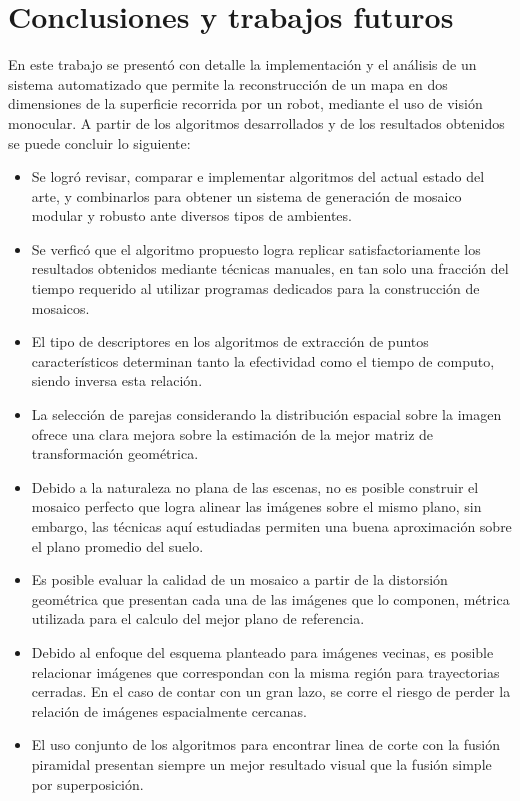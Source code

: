 \chapter{Conclusiones y trabajos futuros}
\label{capitulo6}

En este trabajo se presentó con detalle la implementación y el análisis de un sistema automatizado que permite la reconstrucción de un mapa en dos dimensiones de la superficie recorrida por un robot, mediante el uso de visión monocular. A partir de los algoritmos desarrollados y de los resultados obtenidos se puede concluir lo siguiente:

\begin{itemize}
	\item Se logró revisar, comparar e implementar algoritmos del actual estado del arte, y combinarlos para obtener un sistema de generación de mosaico modular y robusto ante diversos tipos de ambientes.
	
	\item Se verficó que el algoritmo propuesto logra replicar satisfactoriamente los resultados obtenidos mediante técnicas manuales, en tan solo una fracción del tiempo requerido al utilizar programas dedicados para la construcción de mosaicos. 
	
	\item El tipo de descriptores en los algoritmos de extracción de puntos característicos determinan tanto la efectividad como el tiempo de computo, siendo inversa esta relación.
	
	\item La selección de parejas considerando la distribución espacial sobre la imagen ofrece una clara mejora sobre la estimación de la mejor matriz de transformación geométrica.
	
	\item Debido a la naturaleza no plana de las escenas, no es posible construir el mosaico perfecto que logra alinear las imágenes sobre el mismo plano, sin embargo, las técnicas aquí estudiadas permiten una buena aproximación sobre el plano promedio del suelo.
	
	\item Es posible evaluar la calidad de un mosaico a partir de la distorsión geométrica que presentan cada una de las imágenes que lo componen, métrica utilizada para el calculo del mejor plano de referencia.
	
	\item Debido al enfoque del esquema planteado para imágenes vecinas, es posible relacionar imágenes que correspondan con la misma región para trayectorias cerradas. En el caso de contar con un gran lazo, se corre el riesgo de perder la relación de imágenes espacialmente cercanas.
	
	\item El uso conjunto de los algoritmos para encontrar linea de corte con la fusión piramidal presentan siempre un mejor resultado visual que la fusión simple por superposición.
		
\end{itemize}

